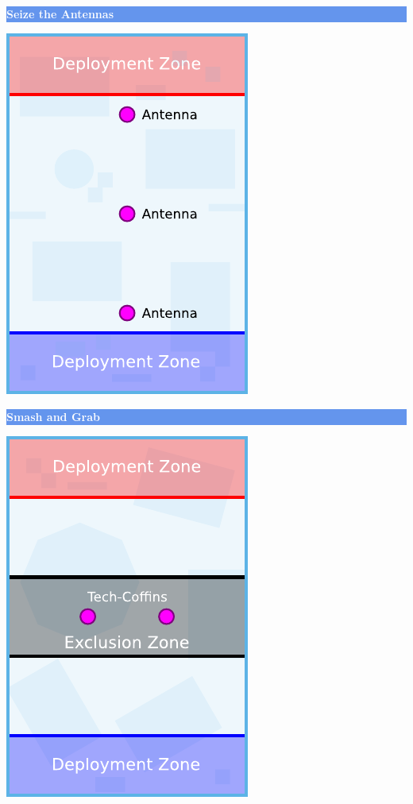 \documentclass[14pt,dvipsnames]{extarticle}
\begin{document}
\noindent\hfill
\begin{minipage}{2in}\centering
\colorbox{CornflowerBlue}{\parbox[t][12pt]{\linewidth}{\centering\textcolor{White}{\textbf{Seize the Antennas}}}}

\smallskip
\includegraphics[scale=0.9]{maps/map-seizetheantennas}
\end{minipage}
\hfill
\begin{minipage}{2in}\centering
\colorbox{CornflowerBlue}{\parbox[t][12pt]{\linewidth-2\fboxsep}{\centering\textcolor{White}{\textbf{Smash and Grab}}}}

\smallskip
\includegraphics[scale=0.9]{maps/map-smashandgrab}
\end{minipage}
\end{document}
